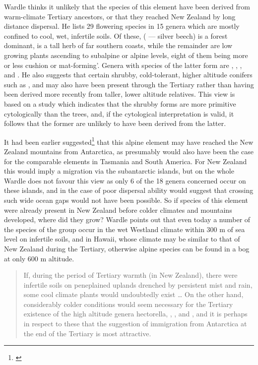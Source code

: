 Wardle thinks it unlikely that the species of this element have been derived from warm-climate Tertiary ancestors, or that they reached New Zealand by long distance dispersal.
He lists 29 flowering species in 15 genera which are mostly confined to cool, wet, infertile soils.
Of these,  ( --- silver beech) is a forest dominant,  is a tall herb of far southern coasts, while the remainder are low growing plants ascending to subalpine or alpine levels, eight of them being more or less cushion or mat-forming'.
Genera with species of the latter form are , , ,  and .
He also suggests that certain shrubby, cold-tolerant, higher altitude conifers such as ,  and  may also have been present through the Tertiary rather than having been derived more recently from taller, lower altitude relatives.
This view is based on a study which indicates that the shrubby forms are more primitive cytologically than the trees, and, if the cytological interpretation is valid, it follows that the former are unlikely to have been derived from the latter.

It had been earlier suggested\footnote{\cite{fleming1963age}} that this alpine element may have reached the New Zealand mountains from Antarctica, as presumably would also have been the case for the comparable elements in Tasmania and South America.
For New Zealand this would imply a migration via the subantarctic islands, but on the whole Wardle does not favour this view as only 6 of the 18 genera concerned occur on these islands, and in the case of  poor dispersal ability would suggest that crossing such wide ocean gaps would not have been possible.
So if species of this element were already present in New Zealand before colder climates and mountains developed, where did they grow? Wardle points out that even today a number of the species of the group occur in the wet Westland climate within 300 m of sea level on infertile soils, and in Hawai{\okina}i, whose climate may be similar to that of New Zealand during the Tertiary, otherwise alpine species can be found in a bog at only 600 m altitude.

\begin{quote}
	If, during the period of Tertiary warmth (in New Zealand), there were infertile soils on peneplained uplands drenched by persistent mist and rain, some cool climate plants would undoubtedly exist … On the other hand, considerably colder conditions would seem necessary for the Tertiary existence of the high altitude genera hectorella, , ,  and , and it is perhaps in respect to these that the suggestion of immigration from Antarctica at the end of the Tertiary is most attractive.
\end{quote}


